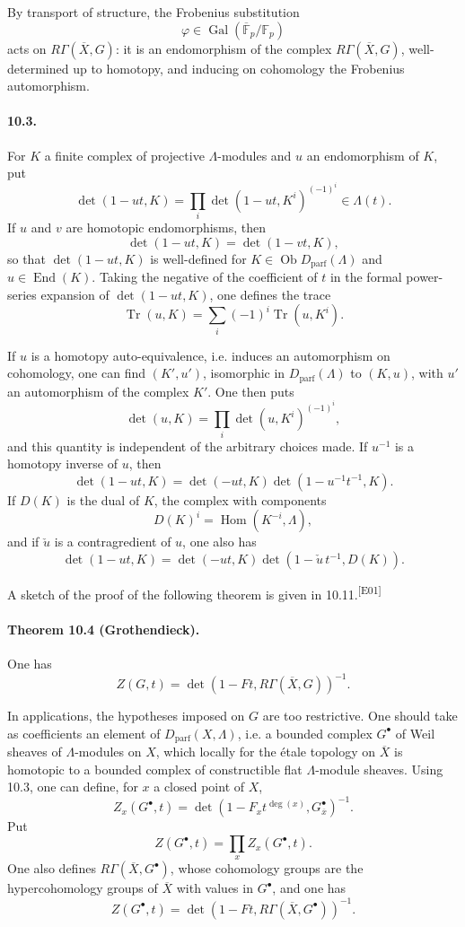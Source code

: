 \documentclass[10pt,letterpaper]{article}
\newcommand{\F}{\mathbb F}
\newcommand{\Gal}{\operatorname{Gal}}
\newcommand{\Hom}{\operatorname{Hom}}
\newcommand{\Tr}{\operatorname{Tr}}
\providecommand{\Gal}{\operatorname{Gal}}
\providecommand{\Hom}{\operatorname{Hom}}
\providecommand{\End}{\operatorname{End}}
\providecommand{\Gal}{\operatorname{Gal}}
\providecommand{\Hom}{\operatorname{Hom}}
\providecommand{\Tr}{\operatorname{Tr}}
\providecommand{\Dparf}{D_{\mathrm{parf}}}
\providecommand{\Gal}{\operatorname{Gal}}
\providecommand{\Hom}{\operatorname{Hom}}
\providecommand{\End}{\operatorname{End}}
\providecommand{\Tr}{\operatorname{Tr}}
\providecommand{\Gal}{\operatorname{Gal}}
\providecommand{\Tr}{\operatorname{Tr}}
\newcommand{\auditmark}[1]{\textsuperscript{\normalfont\scriptsize[E#1]}}
\begin{document}
By transport of structure, the Frobenius substitution
\[
\varphi\in\Gal(\overline{\F}_p/\F_p)
\]
acts on \(R\Gamma(\overline X,G)\): it is an endomorphism of the complex \(R\Gamma(\overline X,G)\), well-determined up to homotopy, and inducing on cohomology the Frobenius automorphism.

\paragraph{10.3.} For \(K\) a finite complex of projective \(\Lambda\)-modules and \(u\) an endomorphism of \(K\), put
\[
\tag{10.3.1}
\det(1-ut,K)=
\prod_i\det(1-ut,K^i)^{(-1)^i}\in\Lambda(t).
\]
If \(u\) and \(v\) are homotopic endomorphisms, then
\[
\det(1-ut,K)=\det(1-vt,K),
\]
so that \(\det(1-ut,K)\) is well-defined for \(K\in\operatorname{Ob}\Dparf(\Lambda)\) and \(u\in\End(K)\). Taking the negative of the coefficient of \(t\) in the formal power-series expansion of \(\det(1-ut,K)\), one defines the trace
\[
\tag{10.3.2}
\Tr(u,K)=\sum_i(-1)^i\Tr(u,K^i).
\]

If \(u\) is a homotopy auto-equivalence, i.e. induces an automorphism on cohomology, one can find \((K',u')\), isomorphic in \(\Dparf(\Lambda)\) to \((K,u)\), with \(u'\) an automorphism of the complex \(K'\). One then puts
\[
\tag{10.3.3}
\det(u,K)=\prod_i\det(u,K^i)^{(-1)^i},
\]
and this quantity is independent of the arbitrary choices made. If \(u^{-1}\) is a homotopy inverse of \(u\), then
\[
\tag{10.3.4}
\det(1-ut,K)=\det(-ut,K)\det(1-u^{-1}t^{-1},K).
\]
If \(D(K)\) is the dual of \(K\), the complex with components
\[
D(K)^i=\Hom(K^{-i},\Lambda),
\]
and if \(\check u\) is a contragredient of \(u\), one also has
\[
\tag{10.3.5}
\det(1-ut,K)=\det(-ut,K)\det(1-\check u\,t^{-1},D(K)).
\]

A sketch of the proof of the following theorem is given in 10.11.\auditmark{01}

\paragraph{Theorem 10.4 (Grothendieck).} One has
\[
\tag{10.4.1}
Z(G,t)=\det(1-Ft,R\Gamma(\overline X,G))^{-1}.
\]

In applications, the hypotheses imposed on \(G\) are too restrictive. One should take as coefficients an element of \(\Dparf(X,\Lambda)\), i.e. a bounded complex \(G^\bullet\) of Weil sheaves of \(\Lambda\)-modules on \(X\), which locally for the étale topology on \(\overline X\) is homotopic to a bounded complex of constructible flat \(\Lambda\)-module sheaves. Using 10.3, one can define, for \(x\) a closed point of \(X\),
\[
Z_x(G^\bullet,t)=
\det(1-F_x t^{\deg(x)},G_{\overline x}^\bullet)^{-1}.
\]
Put
\[
Z(G^\bullet,t)=\prod_x Z_x(G^\bullet,t).
\]
One also defines \(R\Gamma(\overline X,G^\bullet)\), whose cohomology groups are the hypercohomology groups of \(\overline X\) with values in \(G^\bullet\), and one has
\[
\tag{10.4.2}
Z(G^\bullet,t)=
\det(1-Ft,R\Gamma(\overline X,G^\bullet))^{-1}.
\]
\end{document}
